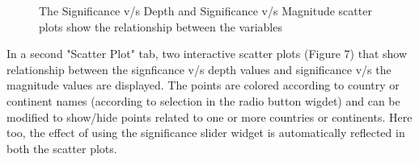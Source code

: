 \documentclass{article}
\begin{document}
		\begin{figure}
			\caption{The Significance v/s Depth and Significance v/s Magnitude scatter plots show the relationship between the variables}
		\end{figure}
		
		In a second "Scatter Plot" tab, two interactive scatter plots (Figure 7) that show relationship between the signficance v/s depth values and significance v/s the magnitude values are displayed. The points are colored according to country or continent names (according to selection in the radio button wigdet) and can be modified to show/hide points related to one or more countries or continents. Here too, the effect of using the significance slider widget is automatically reflected in both the scatter plots.
	
\end{document}
